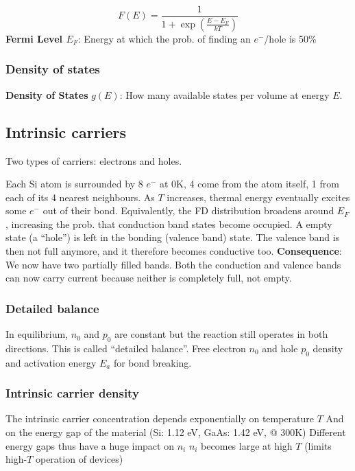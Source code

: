 \documentclass[a4paper, fontsize=8pt, landscape, DIV=1]{scrartcl}
\begin{document}
\begin{multicols*}{4}
  \[F(E) = \frac{1}{1+\exp\left(\frac{E-E_F}{kT}\right)}\]
  \textbf{Fermi Level $E_F$}: Energy at which the prob. of finding an $e^-$/hole is 50\%

  \subsubsection{Density of states}
  \textbf{Density of States} $g(E)$: How many available states per volume at energy $E$.
  
  \subsection{Intrinsic carriers}
  Two types of carriers: electrons and holes.
  
  Each Si atom is surrounded by 8 $e^-$ at 0K, 4 come from the atom itself, 1 from each of its 4 nearest neighbours.
  As $T$ increases, thermal energy eventually excites some $e^-$ out of their bond. 
  Equivalently, the FD distribution broadens around $E_F$, increasing the prob. that conduction band states become occupied.
  A empty state (a ``hole'') is left in the bonding (valence band) state. 
  The valence band is then not full anymore, and it therefore becomes conductive too.
  \textbf{Consequence}: We now have two partially filled bands. 
  Both the conduction and valence bands can now carry current because neither is completely full, not empty.
  

  \subsubsection{Detailed balance}
  In equilibrium, $n_0$ and $p_0$ are constant but the reaction still operates in both directions. This is called ``detailed balance''.
  Free electron $n_0$ and hole $p_0$ density and activation energy $E_a$ for bond breaking.

  \subsubsection{Intrinsic carrier density}
  The intrinsic carrier concentration depends exponentially on temperature $T$
  And on the energy gap of the material (Si: 1.12 eV, GaAs: 1.42 eV, @ 300K)
  Different energy gaps thus have a huge impact on $n_i$
  $n_i$ becomes large at high $T$ (limits high-$T$ operation of devices)


\end{multicols*}
\end{document}
